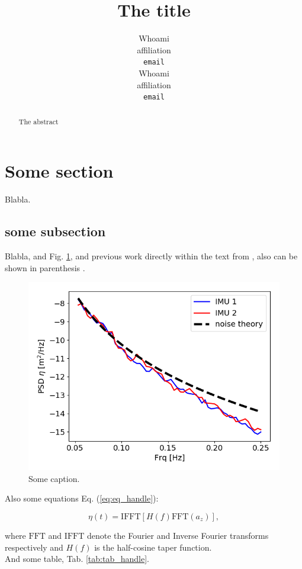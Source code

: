 \documentclass{article}
\title{The title}
\author{
  Whoami\\
  affiliation\\
  \texttt{email} \\
   \And
  Whoami\\
  affiliation\\
  \texttt{email} \\
}
\begin{document}
\maketitle

\begin{abstract}
  The abstract
\end{abstract}


\section{Some section}

Blabla.

\subsection{some subsection}

Blabla, and Fig. \ref{fig:fig_handle}, and previous work directly within the text from \citet{JGRC21649}, also can be shown in parenthesis \citep{JGRC21649}.

\begin{figure}[h]
  \begin{center}
    \includegraphics[width=.45\textwidth]{./Figures/noise_verification}
    \caption{\label{fig:fig_handle} Some caption.}
  \end{center}
\end{figure}

Also some equations Eq. (\ref{eq:eq_handle}):

\begin{equation}
	\eta(t) = \mathrm{IFFT}\left[H(f)\mathrm{FFT}(a_z)\right],
	\label{eq:eq_handle}
\end{equation}

where $\mathrm{FFT}$ and $\mathrm{IFFT}$ denote the Fourier and Inverse Fourier transforms respectively and $H(f)$ is the half-cosine taper function. \\

And some table, Tab. \ref{tab:tab_handle}.
\end{document}
